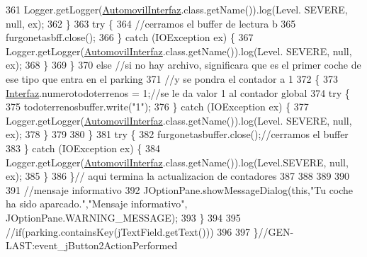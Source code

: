 \begin{DoxyCode}
361                         Logger.getLogger(\mbox{\hyperlink{classejercicio2_1_1_automovil_interfaz_a0ebeee030ec43693c371da3b68222644}{AutomovilInterfaz}}.class.getName()).log(Level.
      SEVERE, null, ex);
362                     \}
363                     \textcolor{keywordflow}{try} \{
364                         \textcolor{comment}{//cerramos el buffer de lectura b}
365                         furgonetasbff.close();
366                     \} \textcolor{keywordflow}{catch} (IOException ex) \{
367                         Logger.getLogger(\mbox{\hyperlink{classejercicio2_1_1_automovil_interfaz_a0ebeee030ec43693c371da3b68222644}{AutomovilInterfaz}}.class.getName()).log(Level.
      SEVERE, null, ex);
368                     \}
369             \}
370             \textcolor{keywordflow}{else}    \textcolor{comment}{//si no hay archivo, significara que es el primer coche de ese tipo que entra en el
       parking}
371                     \textcolor{comment}{//y se pondra el contador a 1}
372             \{
373                 \mbox{\hyperlink{namespace_interfaz}{Interfaz}}.numerotodoterrenos = 1;\textcolor{comment}{//se le da valor 1 al contador global}
374                     \textcolor{keywordflow}{try} \{
375                         todoterrenosbuffer.write(\textcolor{stringliteral}{"1"});
376                     \} \textcolor{keywordflow}{catch} (IOException ex) \{
377                         Logger.getLogger(\mbox{\hyperlink{classejercicio2_1_1_automovil_interfaz_a0ebeee030ec43693c371da3b68222644}{AutomovilInterfaz}}.class.getName()).log(Level.
      SEVERE, null, ex);
378                     \}
379                 
380             \}
381                 \textcolor{keywordflow}{try} \{
382                     furgonetasbuffer.close();\textcolor{comment}{//cerramos el buffer}
383                 \} \textcolor{keywordflow}{catch} (IOException ex) \{
384                     Logger.getLogger(\mbox{\hyperlink{classejercicio2_1_1_automovil_interfaz_a0ebeee030ec43693c371da3b68222644}{AutomovilInterfaz}}.class.getName()).log(Level.SEVERE, 
      null, ex);
385                 \}
386         \}\textcolor{comment}{// aqui termina la actualizacion de contadores}
387         
388         
389         
390         
391         \textcolor{comment}{//mensaje informativo}
392             JOptionPane.showMessageDialog(\textcolor{keyword}{this},\textcolor{stringliteral}{"Tu coche ha sido aparcado."},\textcolor{stringliteral}{"Mensaje informativo"},
      JOptionPane.WARNING\_MESSAGE);
393         \}
394         
395         \textcolor{comment}{//if(parking.containsKey(jTextField.getText()))}
396         
397     \}\textcolor{comment}{//GEN-LAST:event\_jButton2ActionPerformed}
\end{DoxyCode}
\mbox{\label{classejercicio2_1_1_automovil_interfaz_a250dab0b1f55b81b783a0a0862891584}} 
